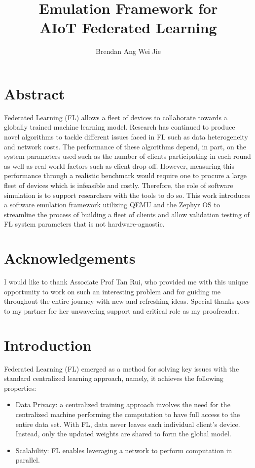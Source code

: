 \documentclass[12pt]{article}
\title{Emulation Framework for\protect\\ AIoT Federated Learning}
\author{Brendan Ang Wei Jie}
\begin{document}
\maketitle

\pagebreak
\section{Abstract}
Federated Learning (FL) allows a fleet of devices to collaborate towards a globally trained machine
learning model. Research has continued to produce novel algorithms to tackle
different issues faced in FL such as data heterogeneity and network costs. The performance
of these algorithms depend, in part, on the system parameters used
such as the number of clients participating in each round as well as real world factors such as
client drop off. However, measuring this performance through a realistic benchmark would require
one to procure a large fleet of devices which is infeasible and costly. Therefore, the role of
software simulation is to support researchers with the tools to do so. This work introduces a
software emulation framework utilizing QEMU and the Zephyr OS to
streamline the process of building a fleet of clients and allow validation testing of FL system
parameters that is not hardware-agnostic.
\pagebreak
  \section{Acknowledgements}
  I would like to thank Associate Prof Tan Rui, who provided me with this unique opportunity to work
  on such an interesting problem and for guiding me throughout the entire journey with new and
  refreshing ideas. Special thanks goes to my
  partner for her unwavering support and critical role as my proofreader.
\pagebreak
\tableofcontents
\listoffigures
\pagebreak

\section{Introduction}
Federated Learning (FL) emerged as a method for solving key issues with the standard centralized learning
approach, namely, it achieves the following properties:
\begin{itemize}
  \item Data Privacy: a centralized training approach involves the need for the centralized
    machine performing the computation to have full access to the entire data set. With FL, data never
    leaves each individual client's device. Instead, only the updated weights are shared to form the
    global model.
  \item Scalability: FL enables leveraging a network to perform computation in parallel.
\end{itemize}
\end{document}
